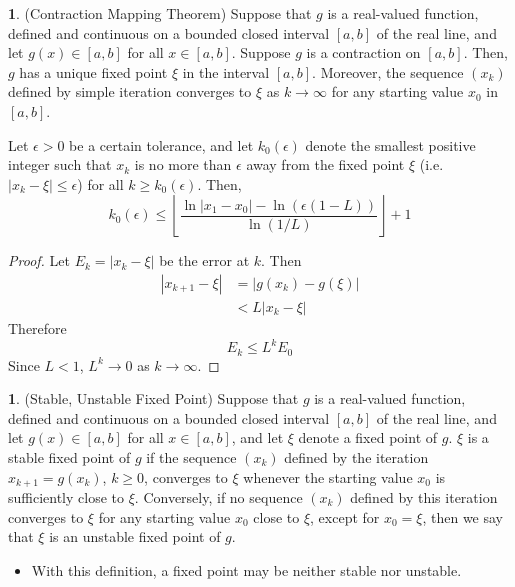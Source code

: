 \documentclass[12pt]{article}
\theoremstyle{definition}
\newtheorem{definition}{\color{NavyBlue}{\textbf{Definition}}}
\newtheorem{theorem}{\color{ForestGreen}{\textbf{Theorem}}}
\theoremstyle{definition}
\begin{document}
\begin{theorem}(Contraction Mapping Theorem)
Suppose that $g$ is a real-valued function, defined and continuous on a bounded closed interval $[a,b]$ of the real line, and let $g(x) \in [a,b]$ for all $x \in [a,b]$. Suppose $g$ is a contraction on $[a,b]$. Then, $g$ has a unique fixed point $\xi$ in the interval $[a,b]$. Moreover, the sequence $(x_k)$ defined by simple iteration converges to $\xi$ as $k \to \infty$ for any starting value $x_0$ in $[a,b]$. 

Let $\epsilon > 0$ be a certain tolerance, and let $k_0 (\epsilon)$ denote the smallest positive integer such that $x_k$ is no more than $\epsilon$ away from the fixed point $\xi$ (i.e. $|x_k - \xi| \leq \epsilon$) for all $k \geq k_0 (\epsilon)$. Then,
\begin{equation}
k_0 (\epsilon) \leq \left\lfloor \frac{\ln|x_1 - x_0| - \ln(\epsilon (1 - L))}{\ln (1 / L)}\right\rfloor + 1
\end{equation}
\end{theorem}

\begin{proof}
Let $E_k = |x_k - \xi|$ be the error at $k$. Then 
\begin{align*}
|x_{k+1} - \xi| &= |g(x_k) - g(\xi)| \\
&< L |x_k - \xi|
\end{align*}
Therefore
\begin{equation}
	E_{k} \leq L^k E_0
\end{equation}
Since $L < 1$, $L^k \to 0$ as $k \to \infty$.
\end{proof}

\begin{definition}(Stable, Unstable Fixed Point)
Suppose that $g$ is a real-valued function, defined and continuous on a bounded closed interval $[a,b]$ of the real line, and let $g(x) \in [a,b]$ for all $x \in [a,b]$, and let $\xi$ denote a fixed point of $g$. $\xi$ is a stable fixed point of $g$ if the sequence $(x_k)$ defined by the iteration $x_{k+1} = g(x_k)$, $k\geq 0$, converges to $\xi$ whenever the starting value $x_0$ is sufficiently close to $\xi$. Conversely, if no sequence $(x_k)$ defined by this iteration converges to $\xi$ for any starting value $x_0$ close to $\xi$, except for $x_0 = \xi$, then we say that $\xi$ is an unstable fixed point of $g$. 
\end{definition}
\begin{itemize}
\item With this definition, a fixed point may be neither stable nor unstable.
\end{itemize}
\end{document}
